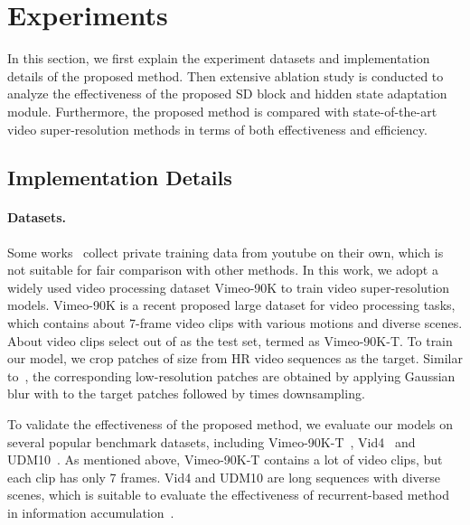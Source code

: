 \section{Experiments}
\label{experiment}
In this section, we first explain the experiment datasets and implementation details of the proposed method. Then extensive ablation study is conducted to analyze the effectiveness of the proposed SD block and hidden state adaptation module. Furthermore, the proposed method is compared with state-of-the-art video super-resolution methods in terms of both effectiveness and efficiency.

\subsection{Implementation Details}
\paragraph{\textbf{Datasets.}}
Some works~\cite{sajjadi2018frame,yi2019progressive} collect private training data from youtube on their own, which is not suitable for fair comparison with other methods. In this work, we adopt a widely used video processing dataset Vimeo-90K to train video super-resolution models. Vimeo-90K is a recent proposed large dataset for video processing tasks, which contains about  7-frame video clips with various motions and diverse scenes. About  video clips select out of  as the test set, termed as Vimeo-90K-T. To train our model, we crop patches of size  from HR video sequences as the target. Similar to~\cite{jo2018deep,sajjadi2018frame,Fuoli-arxiv19-rlsp,yi2019progressive}, the corresponding low-resolution patches are obtained by applying Gaussian blur with  to the target patches followed by  times downsampling.

To validate the effectiveness of the proposed method, we evaluate our models on several popular benchmark datasets, including Vimeo-90K-T~\cite{xue2019video}, Vid4~\cite{liu2013bayesian} and UDM10~\cite{yi2019progressive}. As mentioned above, Vimeo-90K-T contains a lot of video clips, but each clip has only 7 frames. Vid4 and UDM10 are long sequences with diverse scenes, which is suitable to evaluate the effectiveness of recurrent-based method in information accumulation~\cite{sajjadi2018frame,Fuoli-arxiv19-rlsp}.


